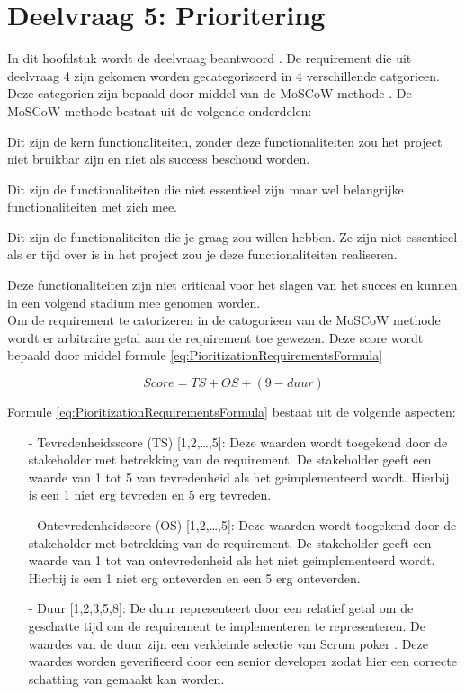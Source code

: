 \section{Deelvraag 5: Prioritering}
In dit hoofdstuk wordt de deelvraag beantwoord \textit{\SubquestionFive}.
De requirement die uit deelvraag 4 zijn gekomen worden gecategoriseerd in 4 verschillende catgorieen.
Deze categorien zijn bepaald door middel van de MoSCoW methode \Parencite{MoSCoW}.
De MoSCoW methode bestaat uit de volgende onderdelen:

\whitespace
{} Dit zijn de kern functionaliteiten, zonder deze functionaliteiten zou het project niet bruikbar zijn en niet als success beschoud worden.

\whitespace[1]
 Dit zijn de functionaliteiten die niet essentieel zijn maar wel belangrijke functionaliteiten met zich mee.

\whitespace[1]
 Dit zijn de functionaliteiten die je graag zou willen hebben.
Ze zijn niet essentieel als er tijd over is in het project zou je deze functionaliteiten realiseren.

\whitespace[1]
 Deze functionaliteiten zijn niet criticaal voor het slagen van het succes en kunnen in een volgend stadium mee genomen worden.\\

\whitespace[2]
Om de requirement te catorizeren in de catogorieen van de MoSCoW methode wordt er arbitraire getal aan de requirement toe gewezen.
Deze score wordt bepaald door middel formule \ref{eq:PioritizationRequirementsFormula}

\begin{equation}
	\label{eq:PioritizationRequirementsFormula}
	Score = TS + OS + (9 - duur)
\end{equation}

Formule \ref{eq:PioritizationRequirementsFormula} bestaat uit de volgende aspecten:
\begin{enumerate}
	\item[-] Tevredenheidsscore (TS) [1,2,\ldots,5]: Deze waarden wordt toegekend door de stakeholder met betrekking van de requirement.
	      De stakeholder geeft een waarde van 1 tot 5 van tevredenheid als het geimplementeerd wordt.
	      Hierbij is een 1 niet erg tevreden en 5 erg tevreden.
	\item[-] Ontevredenheidscore (OS) [1,2,\dots,5]: Deze waarden wordt toegekend door de stakeholder met betrekking van de requirement.
	      De stakeholder geeft een waarde van 1 tot van ontevredenheid als het niet geimplementeerd wordt.
	      Hierbij is een 1 niet erg onteverden en een 5 erg onteverden.
	\item[-] Duur [1,2,3,5,8]: De duur representeert door een relatief getal om de geschatte tijd om de requirement te implementeren te representeren.
	      De waardes van de duur zijn een verkleinde selectie van Scrum poker \Parencite{ScrumPoker}.
	      Deze waardes worden geverifieerd door een senior developer zodat hier een correcte schatting van gemaakt kan worden.
\end{enumerate}


